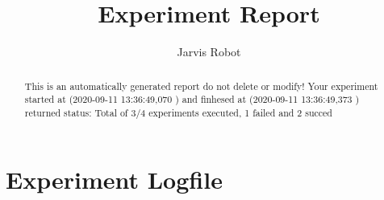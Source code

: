 \title{Experiment Report}
\author{Jarvis Robot}
\maketitle

\begin{abstract}
This is an automatically generated report do not delete or modify!
Your experiment started at (2020-09-11 13:36:49,070 ) and finhesed at (2020-09-11 13:36:49,373 )
returned status:  Total of 3/4 experiments executed, 1 failed and 2 succed
\end{abstract}


\section{Experiment Logfile}

